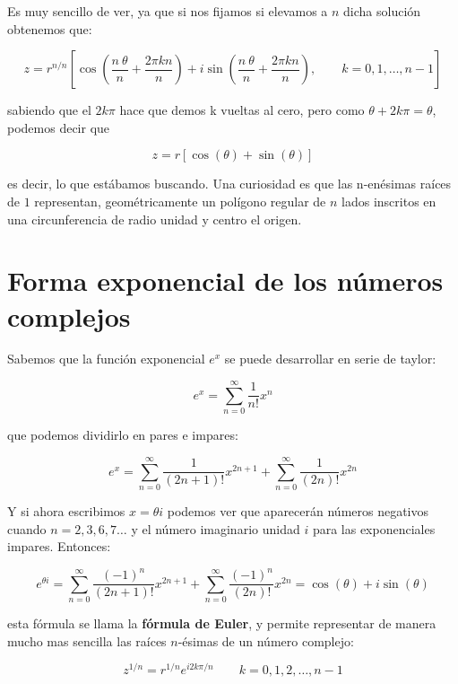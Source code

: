 \documentclass[12pt,a4paper]{book}
\newcommand{\parentesis}[1]{\left( #1  \right)}
\newcommand{\ccorchetes}[1]{\left[ #1  \right]}
\begin{document}
Es muy sencillo de ver, ya que si nos fijamos si elevamos a $n$ dicha solución obtenemos que:

$$
z = r^{n/n} \ccorchetes{ \cos \parentesis{\frac{n \ \theta}{n}+ \frac{2 \pi k n}{n}} + i \sin \parentesis{\frac{n \ \theta}{n}+ \frac{2 \pi k n}{n}}, \quad \quad k=0,1,\ldots,n-1}$$

sabiendo que el $2k \pi$ hace que demos k vueltas al cero, pero como $\theta + 2k \pi = \theta$, podemos decir que

$$ z = r \ccorchetes{\cos(\theta) + \sin (\theta)} $$ 

es decir, lo que estábamos buscando. Una curiosidad es que las n-enésimas raíces de $1$ representan, geométricamente un polígono regular de $n$ lados inscritos en una circunferencia de radio unidad y centro el origen. 


\section{Forma exponencial de los números complejos}

Sabemos que la función exponencial $e^x$ se puede desarrollar en serie de taylor: 

\begin{equation}
e^x = \sum_{n=0}^{\infty} \dfrac{1}{n!} x^n 
\end{equation}

que podemos dividirlo en pares e impares:

\begin{equation}
e^x = \sum_{n=0}^{\infty} \dfrac{1}{(2n+1)!} x^{2n+1} + \sum_{n=0}^{\infty} \dfrac{1}{(2n)!} x^{2n} 
\end{equation}

Y si ahora escribimos $x=\theta i$ podemos ver que aparecerán números negativos cuando $n=2,3,6,7 \ldots$ y el número imaginario unidad $i$ para las exponenciales impares. Entonces:

\begin{equation}
e^{\theta i} = \sum_{n=0}^{\infty} \dfrac{(-1)^n}{(2n+1)!} x^{2n+1} + \sum_{n=0}^{\infty} \dfrac{(-1)^n}{(2n)!} x^{2n}  = \cos(\theta) + i \sin  (\theta)
\end{equation} 

esta fórmula se llama la \textbf{fórmula de Euler}, y permite representar de manera mucho mas sencilla las raíces $n$-ésimas de un número complejo:

\begin{equation}
z^{1/n} = r^{1/n} e^{i 2k \pi / n} \quad \quad k = 0,1,2,\ldots,n-1
\end{equation}
\end{document}
